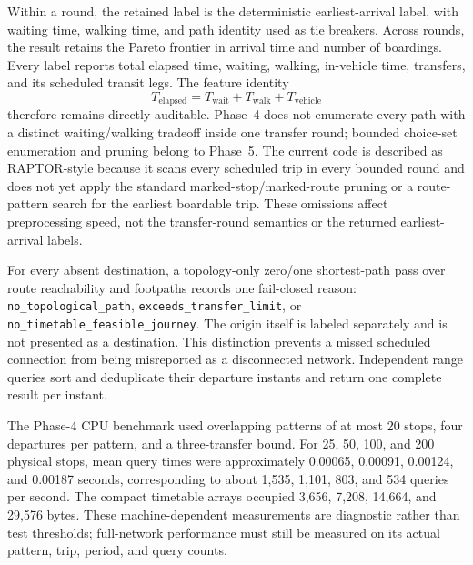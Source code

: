 Within a round, the retained label is the deterministic earliest-arrival label,
with waiting time, walking time, and path identity used as tie breakers.  Across
rounds, the result retains the Pareto frontier in arrival time and number of
boardings.  Every label reports total elapsed time, waiting, walking,
in-vehicle time, transfers, and its scheduled transit legs.  The feature
identity
\[
T_{\mathrm{elapsed}}
=T_{\mathrm{wait}}+T_{\mathrm{walk}}+T_{\mathrm{vehicle}}
\]
therefore remains directly auditable.  Phase~4 does not enumerate every path
with a distinct waiting/walking tradeoff inside one transfer round; bounded
choice-set enumeration and pruning belong to Phase~5.  The current code is
described as RAPTOR-style because it scans every scheduled trip in every bounded
round and does not yet apply the standard marked-stop/marked-route pruning or a
route-pattern search for the earliest boardable trip.  These omissions affect
preprocessing speed, not the transfer-round semantics or the returned
earliest-arrival labels.

For every absent destination, a topology-only zero/one shortest-path pass over
route reachability and footpaths records one fail-closed reason:
\texttt{no\_topological\_\allowbreak path},
\texttt{exceeds\_transfer\_\allowbreak limit}, or
\texttt{no\_timetable\_\allowbreak feasible\_\allowbreak journey}.  The origin itself is labeled
separately and is not presented as a destination.  This distinction prevents a
missed scheduled connection from being misreported as a disconnected network.
Independent range queries sort and deduplicate their departure instants and
return one complete result per instant.

The Phase-4 CPU benchmark used overlapping patterns of at most 20 stops, four
departures per pattern, and a three-transfer bound.  For 25, 50, 100, and 200
physical stops, mean query times were approximately 0.00065, 0.00091, 0.00124,
and 0.00187 seconds, corresponding to about 1,535, 1,101, 803, and 534 queries
per second.  The compact timetable arrays occupied 3,656, 7,208, 14,664, and
29,576 bytes.  These machine-dependent measurements are diagnostic rather than
test thresholds; full-network performance must still be measured on its actual
pattern, trip, period, and query counts.

